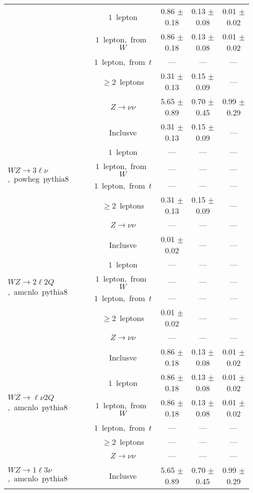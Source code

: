 \documentclass{article}
\begin{document}
\begin{longtable}{|l|c|c|c|c|}
 & $1$~lepton  & 0.86 $\pm$ 0.18  & 0.13 $\pm$ 0.08  & 0.01 $\pm$ 0.02 \\* 
 & $1$~lepton,~from~$W$  & 0.86 $\pm$ 0.18  & 0.13 $\pm$ 0.08  & 0.01 $\pm$ 0.02 \\* 
 & $1$~lepton,~from~$t$  & ---  & ---  & --- \\* 
 & $\ge2$~leptons  & 0.31 $\pm$ 0.13  & 0.15 $\pm$ 0.09  & --- \\* 
 & $Z\rightarrow\nu\nu$  & 5.65 $\pm$ 0.89  & 0.70 $\pm$ 0.45  & 0.99 $\pm$ 0.29 \\* 
\hline 
\multirow{6}{*}{$WZ{\rightarrow}3\ell\nu$,~powheg~pythia8} & Inclusve  & 0.31 $\pm$ 0.13  & 0.15 $\pm$ 0.09  & --- \\* 
 & $1$~lepton  & ---  & ---  & --- \\* 
 & $1$~lepton,~from~$W$  & ---  & ---  & --- \\* 
 & $1$~lepton,~from~$t$  & ---  & ---  & --- \\* 
 & $\ge2$~leptons  & 0.31 $\pm$ 0.13  & 0.15 $\pm$ 0.09  & --- \\* 
 & $Z\rightarrow\nu\nu$  & ---  & ---  & --- \\* 
\hline 
\multirow{6}{*}{$WZ{\rightarrow}2{\ell}2Q$,~amcnlo~pythia8} & Inclusve  & 0.01 $\pm$ 0.02  & ---  & --- \\* 
 & $1$~lepton  & ---  & ---  & --- \\* 
 & $1$~lepton,~from~$W$  & ---  & ---  & --- \\* 
 & $1$~lepton,~from~$t$  & ---  & ---  & --- \\* 
 & $\ge2$~leptons  & 0.01 $\pm$ 0.02  & ---  & --- \\* 
 & $Z\rightarrow\nu\nu$  & ---  & ---  & --- \\* 
\hline 
\multirow{6}{*}{$WZ{\rightarrow}{\ell}{\nu}2Q$,~amcnlo~pythia8} & Inclusve  & 0.86 $\pm$ 0.18  & 0.13 $\pm$ 0.08  & 0.01 $\pm$ 0.02 \\* 
 & $1$~lepton  & 0.86 $\pm$ 0.18  & 0.13 $\pm$ 0.08  & 0.01 $\pm$ 0.02 \\* 
 & $1$~lepton,~from~$W$  & 0.86 $\pm$ 0.18  & 0.13 $\pm$ 0.08  & 0.01 $\pm$ 0.02 \\* 
 & $1$~lepton,~from~$t$  & ---  & ---  & --- \\* 
 & $\ge2$~leptons  & ---  & ---  & --- \\* 
 & $Z\rightarrow\nu\nu$  & ---  & ---  & --- \\* 
\hline 
\multirow{6}{*}{$WZ{\rightarrow}1{\ell}3{\nu}$,~amcnlo~pythia8} & Inclusve  & 5.65 $\pm$ 0.89  & 0.70 $\pm$ 0.45  & 0.99 $\pm$ 0.29 \\* 

\end{longtable}
\end{document}

